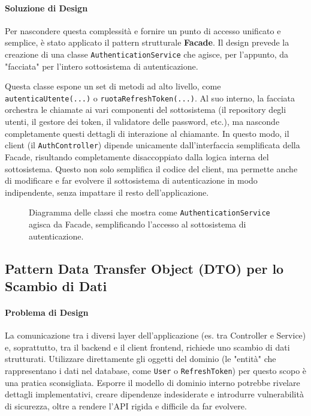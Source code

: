 \documentclass[12pt,a4paper,openright,twoside]{book}
\begin{document}
\paragraph{Soluzione di Design}
Per nascondere questa complessità e fornire un punto di accesso unificato e semplice, è stato applicato il pattern strutturale \textbf{Facade}. Il design prevede la creazione di una classe \texttt{AuthenticationService} che agisce, per l'appunto, da "facciata" per l'intero sottosistema di autenticazione.

Questa classe espone un set di metodi ad alto livello, come \texttt{autenticaUtente(...)} o \texttt{ruotaRefreshToken(...)}. Al suo interno, la facciata orchestra le chiamate ai vari componenti del sottosistema (il repository degli utenti, il gestore dei token, il validatore delle password, etc.), ma nasconde completamente questi dettagli di interazione al chiamante. In questo modo, il client (il \texttt{AuthController}) dipende unicamente dall'interfaccia semplificata della Facade, risultando completamente disaccoppiato dalla logica interna del sottosistema. Questo non solo semplifica il codice del client, ma permette anche di modificare e far evolvere il sottosistema di autenticazione in modo indipendente, senza impattare il resto dell'applicazione.

\vspace{1cm}
\begin{figure}[h!]
    \centering
    \caption{Diagramma delle classi che mostra come \texttt{AuthenticationService} agisca da Facade, semplificando l'accesso al sottosistema di autenticazione.}
    \label{fig:facade_uml}
\end{figure}
\vspace{1cm}

\subsection{Pattern Data Transfer Object (DTO) per lo Scambio di Dati}
\label{subsec:design_dto}

\paragraph{Problema di Design}
La comunicazione tra i diversi layer dell'applicazione (es. tra Controller e Service) e, soprattutto, tra il backend e il client frontend, richiede uno scambio di dati strutturati. Utilizzare direttamente gli oggetti del dominio (le "entità" che rappresentano i dati nel database, come \texttt{User} o \texttt{RefreshToken}) per questo scopo è una pratica sconsigliata. Esporre il modello di dominio interno potrebbe rivelare dettagli implementativi, creare dipendenze indesiderate e introdurre vulnerabilità di sicurezza, oltre a rendere l'API rigida e difficile da far evolvere.
\end{document}
